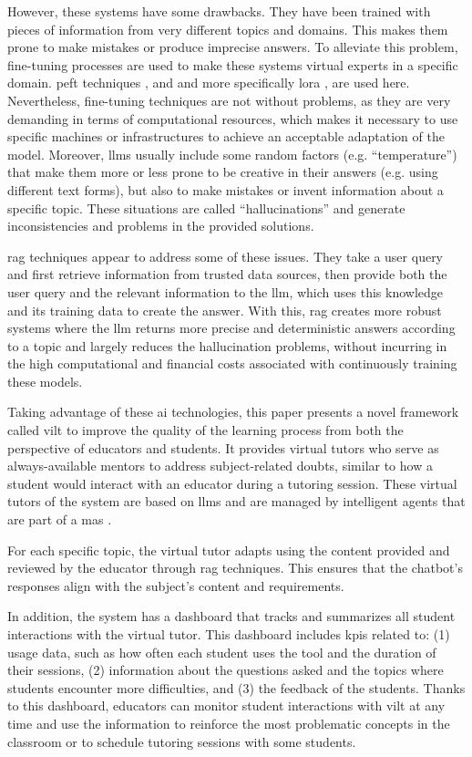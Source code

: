 \documentclass[pdflatex,sn-mathphys-num]{sn-jnl}%
\begin{document}
However, these systems have some drawbacks. They have been trained with pieces of information from very different topics and domains. This makes them prone to make mistakes or produce imprecise answers. To alleviate this problem, fine-tuning processes are used to make these systems virtual experts in a specific domain. \ac{peft} techniques \cite{he2021towards}, and and more specifically \ac{lora} \cite{hu2021lora}, are used here. Nevertheless, fine-tuning techniques are not without problems, as they are very demanding in terms of computational resources, which makes it necessary to use specific machines or infrastructures to achieve an acceptable adaptation of the model. Moreover, \acp{llm} usually include some random factors (e.g. ``temperature'') that make them more or less prone to be creative in their answers (e.g. using different text forms), but also to make mistakes or invent information about a specific topic. These situations are called ``hallucinations'' and generate inconsistencies and problems in the provided solutions.

\ac{rag} techniques \cite{gao2023retrieval} appear to address some of these issues. They take a user query and first retrieve information from trusted data sources, then provide both the user query and the relevant information to the \ac{llm}, which uses this knowledge and its training data to create the answer. With this, \ac{rag} creates more robust systems where the \ac{llm} returns more precise and deterministic answers according to a topic and largely reduces the hallucination problems, without incurring in the high computational and financial costs associated with continuously training these models.

Taking advantage of these \ac{ai} technologies, this paper presents a novel framework called \ac{vilt} to improve the quality of the learning process from both the perspective of educators and students. It provides virtual tutors who serve as always-available mentors to address subject-related doubts, similar to how a student would interact with an educator during a tutoring session. These virtual tutors of the system are based on \acp{llm} and are managed by intelligent agents that are part of a \ac{mas} \cite{dorri2018multi}.

For each specific topic, the virtual tutor adapts using the content provided and reviewed by the educator through \ac{rag} techniques. This ensures that the chatbot's responses align with the subject's content and requirements.

In addition, the system has a dashboard that tracks and summarizes all student interactions with the virtual tutor. This dashboard includes \acp{kpi} related to: (1) usage data, such as how often each student uses the tool and the duration of their sessions, (2) information about the questions asked and the topics where students encounter more difficulties, and (3) the feedback of the students. Thanks to this dashboard, educators can monitor student interactions with \ac{vilt} at any time and use the information to reinforce the most problematic concepts in the classroom or to schedule tutoring sessions with some students.
\end{document}
